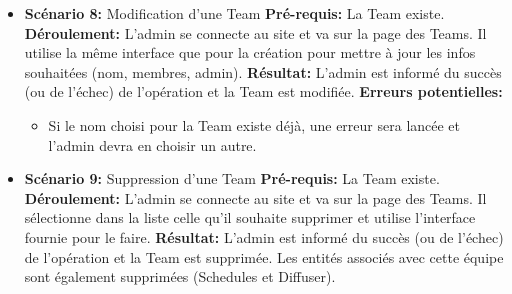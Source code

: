 \documentclass[french]{article}
\begin{document}
\begin{itemize}
		\item \textbf{Scénario 8:} Modification d'une Team\newline
		\textbf{Pré-requis:} La Team existe.\newline
		\textbf{Déroulement:} L'admin se connecte au site et va sur la page des Teams. Il utilise la même interface que pour la création pour mettre à jour les infos souhaitées (nom, membres, admin).\newline
		\textbf{Résultat:} L'admin est informé du succès (ou de l'échec) de l'opération et la Team est modifiée.\newline
		\textbf{Erreurs potentielles:} 
			\begin{itemize}
				\item Si le nom choisi pour la Team existe déjà, une erreur sera lancée et l'admin devra en choisir un autre. \newline
			\end{itemize}
		
		\item \textbf{Scénario 9:} Suppression d'une Team\newline
		\textbf{Pré-requis:} La Team existe.\newline
		\textbf{Déroulement:} L'admin se connecte au site et va sur la page des Teams. Il sélectionne dans la liste celle qu'il souhaite supprimer et utilise l'interface fournie pour le faire. \newline
		\textbf{Résultat:} L'admin est informé du succès (ou de l'échec) de l'opération et la Team est supprimée. Les entités associés avec cette équipe sont également supprimées (Schedules et Diffuser). \newline

					
		\end{itemize}
		\newpage
	 
\end{document}
